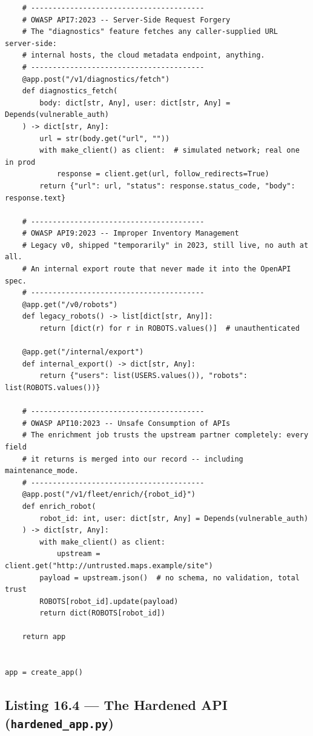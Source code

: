 \begin{verbatim}
    # ----------------------------------------
    # OWASP API7:2023 -- Server-Side Request Forgery
    # The "diagnostics" feature fetches any caller-supplied URL server-side:
    # internal hosts, the cloud metadata endpoint, anything.
    # ----------------------------------------
    @app.post("/v1/diagnostics/fetch")
    def diagnostics_fetch(
        body: dict[str, Any], user: dict[str, Any] = Depends(vulnerable_auth)
    ) -> dict[str, Any]:
        url = str(body.get("url", ""))
        with make_client() as client:  # simulated network; real one in prod
            response = client.get(url, follow_redirects=True)
        return {"url": url, "status": response.status_code, "body": response.text}

    # ----------------------------------------
    # OWASP API9:2023 -- Improper Inventory Management
    # Legacy v0, shipped "temporarily" in 2023, still live, no auth at all.
    # An internal export route that never made it into the OpenAPI spec.
    # ----------------------------------------
    @app.get("/v0/robots")
    def legacy_robots() -> list[dict[str, Any]]:
        return [dict(r) for r in ROBOTS.values()]  # unauthenticated

    @app.get("/internal/export")
    def internal_export() -> dict[str, Any]:
        return {"users": list(USERS.values()), "robots": list(ROBOTS.values())}

    # ----------------------------------------
    # OWASP API10:2023 -- Unsafe Consumption of APIs
    # The enrichment job trusts the upstream partner completely: every field
    # it returns is merged into our record -- including maintenance_mode.
    # ----------------------------------------
    @app.post("/v1/fleet/enrich/{robot_id}")
    def enrich_robot(
        robot_id: int, user: dict[str, Any] = Depends(vulnerable_auth)
    ) -> dict[str, Any]:
        with make_client() as client:
            upstream = client.get("http://untrusted.maps.example/site")
        payload = upstream.json()  # no schema, no validation, total trust
        ROBOTS[robot_id].update(payload)
        return dict(ROBOTS[robot_id])

    return app


app = create_app()
\end{verbatim}

\subsection{Listing 16.4 --- The Hardened API (\texttt{hardened\_app.py})}
\label{lst:ch16-hardened}

